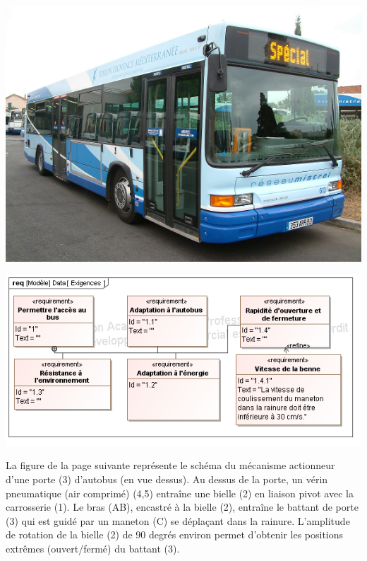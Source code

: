 \documentclass[10pt]{article}
\begin{document}
\begin{minipage}[c]{.3\linewidth}
\begin{center}
\includegraphics[width=.95\textwidth]{images/fig6_1}\hfill
\end{center}
\end{minipage} \hfill
\begin{minipage}[c]{.65\linewidth}
\begin{center}
\includegraphics[width=.95\textwidth]{images/SysML/Exigences_Bus}
\end{center}
\end{minipage}
 
La figure de la page suivante représente le schéma du mécanisme actionneur d'une porte (3) d'autobus (en vue dessus). Au dessus de la porte, un vérin pneumatique (air comprimé) (4,5) entraîne une bielle (2) en liaison pivot avec la carrosserie (1). Le bras (AB), encastré à la bielle (2), entraîne le battant de porte (3) qui est guidé par un maneton (C) se déplaçant dans la rainure. L'amplitude de rotation de la bielle (2) de 90 degrés environ permet d'obtenir les positions extrêmes (ouvert/fermé) du battant (3). 
\end{document}
